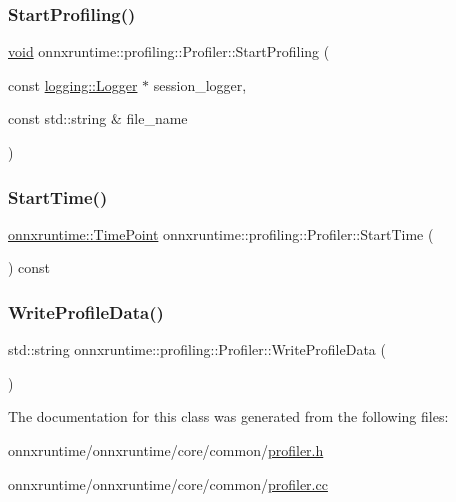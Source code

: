 \subsubsection{\texorpdfstring{Start\+Profiling()}{StartProfiling()}}
{\footnotesize\ttfamily \mbox{\hyperlink{mlasi_8h_a88f941d423cb2a819b70a1358982b1a6}{void}} onnxruntime\+::profiling\+::\+Profiler\+::\+Start\+Profiling (\begin{DoxyParamCaption}\item[{const \mbox{\hyperlink{classonnxruntime_1_1logging_1_1Logger}{logging\+::\+Logger}} $\ast$}]{session\+\_\+logger,  }\item[{const std\+::string \&}]{file\+\_\+name }\end{DoxyParamCaption})}

\mbox{\label{classonnxruntime_1_1profiling_1_1Profiler_a273e1d74c3db999223080120ea89705d}} 
\subsubsection{\texorpdfstring{Start\+Time()}{StartTime()}}
{\footnotesize\ttfamily \mbox{\hyperlink{namespaceonnxruntime_a9b5a17a572f7c3cf77f4892542bd7153}{onnxruntime\+::\+Time\+Point}} onnxruntime\+::profiling\+::\+Profiler\+::\+Start\+Time (\begin{DoxyParamCaption}{ }\end{DoxyParamCaption}) const}

\mbox{\label{classonnxruntime_1_1profiling_1_1Profiler_a90a8c013fd44413ddb1898087f22ae14}} 
\subsubsection{\texorpdfstring{Write\+Profile\+Data()}{WriteProfileData()}}
{\footnotesize\ttfamily std\+::string onnxruntime\+::profiling\+::\+Profiler\+::\+Write\+Profile\+Data (\begin{DoxyParamCaption}{ }\end{DoxyParamCaption})}



The documentation for this class was generated from the following files\+:\begin{DoxyCompactItemize}
\item 
onnxruntime/onnxruntime/core/common/\mbox{\hyperlink{profiler_8h}{profiler.\+h}}\item 
onnxruntime/onnxruntime/core/common/\mbox{\hyperlink{profiler_8cc}{profiler.\+cc}}\end{DoxyCompactItemize}
